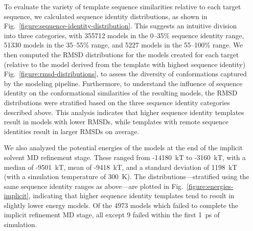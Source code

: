 \documentclass[aps,pre,twocolumn,nofootinbib,superscriptaddress,linenumbers]{revtex4-1}
\begin{document}
To evaluate the variety of template sequence similarities relative to each target sequence, we calculated sequence identity distributions, as shown in Fig.~\ref{figure:sequence-identity-distribution}.
This suggests an intuitive division into three categories, with \num{355712} models in the 0--35\% sequence identity range, \num{51330} models in the 35--55\% range, and \num{5227} models in the 55--100\% range.
We then computed the RMSD distributions for the models created for each target (relative to the model derived from the template with highest sequence identity) Fig.~\ref{figure:rmsd-distributions}, to assess the diversity of conformations captured by the modeling pipeline.
Furthermore, to understand the influence of sequence identity on the conformational similarities of the resulting models, the RMSD distributions were stratified based on the three sequence identity categories described above.
This analysis indicates that higher sequence identity templates result in models with lower RMSDs, while templates with remote sequence identities result in larger RMSDs on average.

We also analyzed the potential energies of the models at the end of the implicit solvent MD refinement stage.
These ranged from -14180~kT to -3160~kT, with a median of -9501~kT, mean of -9418~kT, and a standard deviation of 1198~kT (with a simulation temperature of 300~K).
The distributions---stratified using the same sequence identity ranges as above---are plotted in Fig.~\ref{figure:energies-implicit}, indicating that higher sequence identity templates tend to result in slightly lower energy models.
Of the \num{4973} models which failed to complete the implicit refinement MD stage, all except 9 failed within the first 1~ps of simulation.

\end{document}
